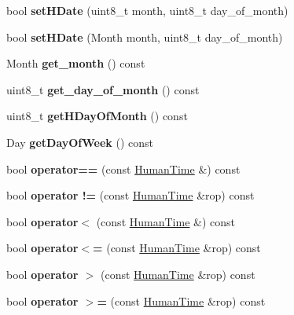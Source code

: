 \begin{DoxyCompactItemize}
bool {\bfseries set\+H\+Date} (uint8\+\_\+t month, uint8\+\_\+t day\+\_\+of\+\_\+month)
\item 
\mbox{\label{classtime_1_1_human_time_a54e17b86a0f75f2cc72f1a6aea390f5d}} 
bool {\bfseries set\+H\+Date} (Month month, uint8\+\_\+t day\+\_\+of\+\_\+month)
\item 
\mbox{\label{classtime_1_1_human_time_a8eb7f84d2388ff277bd90a99273e19c2}} 
Month {\bfseries get\+\_\+month} () const
\item 
\mbox{\label{classtime_1_1_human_time_a4da3cc9f0d098199e4ec05c818bcaf9c}} 
uint8\+\_\+t {\bfseries get\+\_\+day\+\_\+of\+\_\+month} () const
\item 
\mbox{\label{classtime_1_1_human_time_ad5091acde7227648f452f9bb7807064e}} 
uint8\+\_\+t {\bfseries get\+H\+Day\+Of\+Month} () const
\item 
\mbox{\label{classtime_1_1_human_time_a0df9962753a276398b003b31e3081347}} 
Day {\bfseries get\+Day\+Of\+Week} () const
\item 
\mbox{\label{classtime_1_1_human_time_a1a31ff0631b603de8ff27b56192be1fb}} 
bool {\bfseries operator==} (const \mbox{\hyperlink{classtime_1_1_human_time}{Human\+Time}} \&) const
\item 
\mbox{\label{classtime_1_1_human_time_a0ec575a315f2d55c22e248e9e9116fe1}} 
bool {\bfseries operator !=} (const \mbox{\hyperlink{classtime_1_1_human_time}{Human\+Time}} \&rop) const
\item 
\mbox{\label{classtime_1_1_human_time_a9dc74bd5a01b4cf9bc3e6adb8ecaaede}} 
bool {\bfseries operator$<$} (const \mbox{\hyperlink{classtime_1_1_human_time}{Human\+Time}} \&) const
\item 
\mbox{\label{classtime_1_1_human_time_aff3d5d58927eae1f3c38aa5e1d80b20c}} 
bool {\bfseries operator$<$=} (const \mbox{\hyperlink{classtime_1_1_human_time}{Human\+Time}} \&rop) const
\item 
\mbox{\label{classtime_1_1_human_time_a969ce1d3098b47ec014c79b222e3151c}} 
bool {\bfseries operator $>$} (const \mbox{\hyperlink{classtime_1_1_human_time}{Human\+Time}} \&rop) const
\item 
\mbox{\label{classtime_1_1_human_time_a872f2a7e5ddfc19bda6d6b5a2883c635}} 
bool {\bfseries operator $>$=} (const \mbox{\hyperlink{classtime_1_1_human_time}{Human\+Time}} \&rop) const
\end{DoxyCompactItemize}
